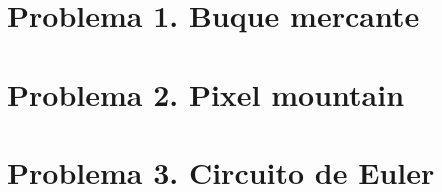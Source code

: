 \documentclass[a4paper,12pt]{article}
\begin{document}


\tableofcontents

\newpage

\section{Problema 1. Buque mercante}




\section{Problema 2. Pixel mountain}




\section{Problema 3. Circuito de Euler}



\end{document}
